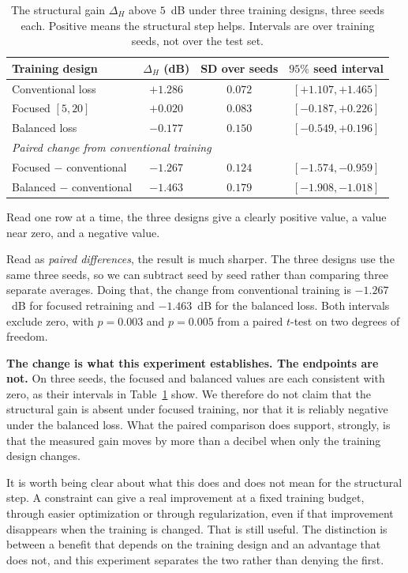 \documentclass[journal]{IEEEtran}
\begin{document}
\begin{table}[!t]
\caption{The structural gain $\Delta_H$ above $5$~dB under three training
designs, three seeds each. Positive means the structural step helps. Intervals
are over training seeds, not over the test set.}
\label{tab:designs}
\centering
\footnotesize
\setlength{\tabcolsep}{4pt}
\begin{tabular}{lccc}
\toprule
Training design & $\Delta_H$ (dB) & SD over seeds & $95\%$ seed interval \\
\midrule
Conventional loss & $\mathbf{+1.286}$ & $0.072$ & $[+1.107,+1.465]$ \\
Focused $[5,20]$ & $+0.020$ & $0.083$ & $[-0.187,+0.226]$ \\
Balanced loss & $-0.177$ & $0.150$ & $[-0.549,+0.196]$ \\
\midrule
\multicolumn{4}{l}{\emph{Paired change from conventional training}}\\
Focused $-$ conventional & $\mathbf{-1.267}$ & $0.124$ & $[-1.574,-0.959]$ \\
Balanced $-$ conventional & $\mathbf{-1.463}$ & $0.179$ & $[-1.908,-1.018]$ \\
\bottomrule
\end{tabular}
\end{table}

Read one row at a time, the three designs give a clearly positive value, a
value near zero, and a negative value.

Read as \emph{paired differences}, the result is much sharper. The three
designs use the same three seeds, so we can subtract seed by seed rather than
comparing three separate averages. Doing that, the change from conventional
training is $-1.267$~dB for focused retraining and $-1.463$~dB for the balanced
loss. Both intervals exclude zero, with $p=0.003$ and $p=0.005$ from a paired
$t$-test on two degrees of freedom.

\textbf{The change is what this experiment establishes. The endpoints are
not.} On three seeds, the focused and balanced values are each consistent with
zero, as their intervals in Table~\ref{tab:designs} show. We therefore do not
claim that the structural gain is absent under focused training, nor that it is
reliably negative under the balanced loss. What the paired comparison does
support, strongly, is that the measured gain moves by more than a decibel when
only the training design changes.

It is worth being clear about what this does and does not mean for the
structural step. A constraint can give a real improvement at a fixed training
budget, through easier optimization or through regularization, even if that
improvement disappears when the training is changed. That is still useful. The
distinction is between a benefit that depends on the training design and an
advantage that does not, and this experiment separates the two rather than
denying the first.
\end{document}
